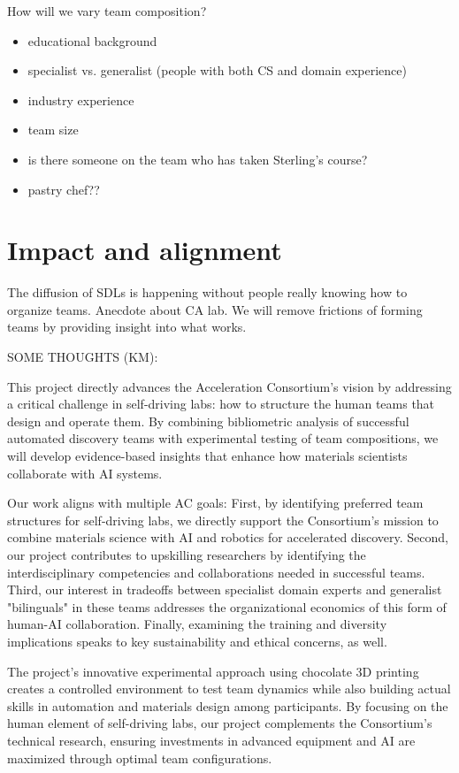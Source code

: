 \documentclass{article}
\begin{document}
How will we vary team composition?
\begin{itemize}
\item {educational background}
\item{specialist vs. generalist (people with both CS and domain experience)}
\item{industry experience}
\item{team size}
\item{is there someone on the team who has taken Sterling's course?}
\item{pastry chef??}
\end{itemize}

\section{Impact and alignment}
The diffusion of SDLs is happening without people really knowing how to organize teams. Anecdote about CA lab. We will remove frictions of forming teams by providing insight into what works.

SOME THOUGHTS (KM):

This project directly advances the Acceleration Consortium's vision by addressing a critical challenge in self-driving labs: how to structure the human teams that design and operate them. By combining bibliometric analysis of successful automated discovery teams with experimental testing of team compositions, we will develop evidence-based insights that enhance how materials scientists collaborate with AI systems.

Our work aligns with multiple AC goals: First, by identifying preferred team structures for self-driving labs, we directly support the Consortium's mission to combine materials science with AI and robotics for accelerated discovery. Second, our project contributes to upskilling researchers by identifying the interdisciplinary competencies and collaborations needed in successful teams. Third, our interest in tradeoffs between specialist domain experts and generalist "bilinguals" in these teams addresses the organizational economics of this form of human-AI collaboration. Finally, examining the training and diversity implications speaks to key sustainability and ethical concerns, as well.

The project's innovative experimental approach using chocolate 3D printing creates a controlled environment to test team dynamics while also building actual skills in automation and materials design among participants. By focusing on the human element of self-driving labs, our project complements the Consortium's technical research, ensuring investments in advanced equipment and AI are maximized through optimal team configurations.
\end{document}
